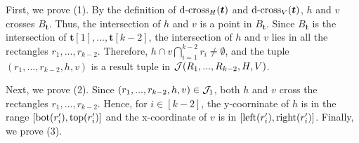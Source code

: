 First, we prove (1). By the definition of $\mathrm{d\text{-}cross}_H(\textrm{\boldmath${t}$})$ and $\mathrm{d\text{-}cross}_V(\textrm{\boldmath${t}$})$, $h$ and $v$ crosses $B_\bm{t}$. Thus, the intersection of $h$ and $v$ is a point in $B_\bm{t}$. Since $B_\bm{t}$ is the intersection of $\bm{t}[1],...,\bm{t}[k-2]$, the intersection of $h$ and $v$ lies in all the rectangles $r_1,...,r_{k-2}$. Therefore, $h\cap v\bigcap_{i = 1}^{k-2}r_i \neq \emptyset$, and  the tuple $(r_1,...,r_{k-2},h,v)$ is a result tuple in $\mathcal{J}(R_1,...,R_{k-2},H,V)$. 

Next, we prove (2). Since $(r_1,...,r_{k-2},h,v)\in \mathcal{J}_1$, both $h$
 and $v$ cross the rectangles $r_1,...,r_{k-2}$. Hence, for $i\in[k-2]$, the y-coorninate of $h$ is in the range $[\mathrm{bot}(r_i'), \mathrm{top}(r_i')]$ and the x-coordinate of $v$ is in $[\mathrm{left}(r_i'), \mathrm{right}(r_i')]$. 
Finally, we prove (3).